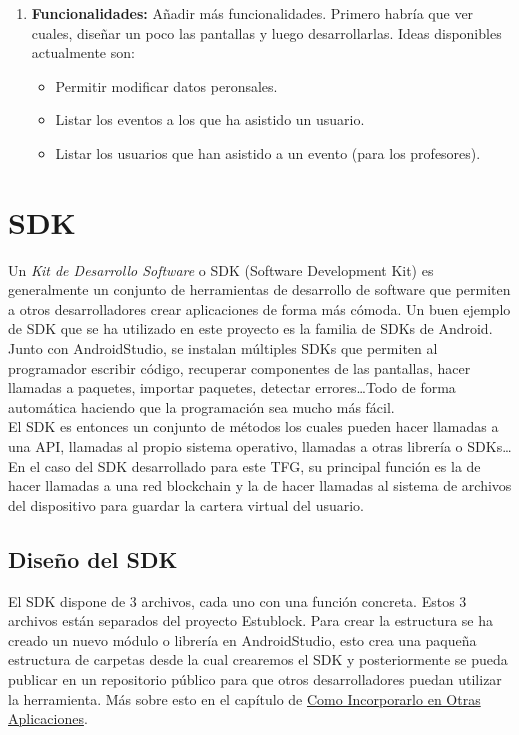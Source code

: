 \begin{enumerate}
\item \textbf{Funcionalidades: } Añadir más funcionalidades. Primero habría que ver cuales, diseñar un poco las pantallas y luego desarrollarlas. Ideas disponibles actualmente son: 
  \begin{itemize}
  \item Permitir modificar datos peronsales.
  \item Listar los eventos a los que ha asistido un usuario.
  \item Listar los usuarios que han asistido a un evento (para los profesores).
  \end{itemize}
\end{enumerate}

\section{SDK} \label{sec:SDK}

Un \emph{Kit de Desarrollo Software} o SDK (Software Development Kit) es generalmente un conjunto de herramientas de desarrollo de software que permiten a otros desarrolladores crear aplicaciones de forma más cómoda. Un buen ejemplo de SDK que se ha utilizado en este proyecto es la familia de SDKs de Android. Junto con AndroidStudio, se instalan múltiples SDKs que permiten al programador escribir código, recuperar componentes de las pantallas, hacer llamadas a paquetes, importar paquetes, detectar errores\dots Todo de forma automática haciendo que la programación sea mucho más fácil. \\

El SDK es entonces un conjunto de métodos los cuales pueden hacer llamadas a una API, llamadas al propio sistema operativo, llamadas a otras librería o SDKs\dots En el caso del SDK desarrollado para este TFG, su principal función es la de hacer llamadas a una red blockchain y la de hacer llamadas al sistema de archivos del dispositivo para guardar la cartera virtual del usuario. 

\subsection{Diseño del SDK}

El SDK dispone de 3 archivos, cada uno con una función concreta. Estos 3 archivos están separados del proyecto Estublock. Para crear la estructura se ha creado un nuevo módulo o librería en AndroidStudio, esto crea una paqueña estructura de carpetas desde la cual crearemos el SDK y posteriormente se pueda publicar en un repositorio público para que otros desarrolladores puedan utilizar la herramienta. Más sobre esto en el capítulo de \hyperref[sec:Maven]{Como Incorporarlo en Otras Aplicaciones}. 


